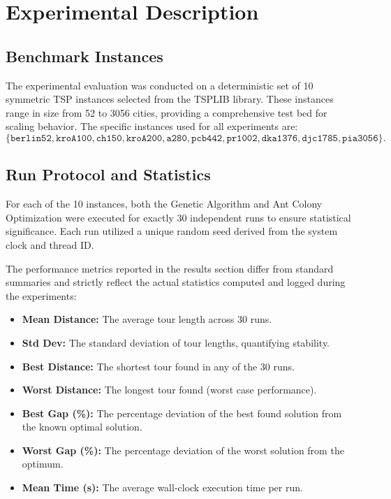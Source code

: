 \documentclass[11pt,a4paper]{article}
\begin{document}
\section{Experimental Description}
\subsection{Benchmark Instances}
The experimental evaluation was conducted on a deterministic set of 10 symmetric TSP instances selected from the TSPLIB library. These instances range in size from 52 to 3056 cities, providing a comprehensive test bed for scaling behavior. The specific instances used for all experiments are:
\[
\{\texttt{berlin52}, \texttt{kroA100}, \texttt{ch150}, \texttt{kroA200}, \texttt{a280}, \texttt{pcb442}, \texttt{pr1002}, \texttt{dka1376}, \texttt{djc1785}, \texttt{pia3056}\}.
\]

\subsection{Run Protocol and Statistics}
For each of the 10 instances, both the Genetic Algorithm and Ant Colony Optimization were executed for exactly 30 independent runs to ensure statistical significance. Each run utilized a unique random seed derived from the system clock and thread ID.

The performance metrics reported in the results section differ from standard summaries and strictly reflect the actual statistics computed and logged during the experiments:
\begin{itemize}[nosep]
  \item \textbf{Mean Distance:} The average tour length across 30 runs.
  \item \textbf{Std Dev:} The standard deviation of tour lengths, quantifying stability.
  \item \textbf{Best Distance:} The shortest tour found in any of the 30 runs.
  \item \textbf{Worst Distance:} The longest tour found (worst case performance).
  \item \textbf{Best Gap (\%):} The percentage deviation of the best found solution from the known optimal solution.
  \item \textbf{Worst Gap (\%):} The percentage deviation of the worst solution from the optimum.
  \item \textbf{Mean Time (s):} The average wall-clock execution time per run.
\end{itemize}
\end{document}
